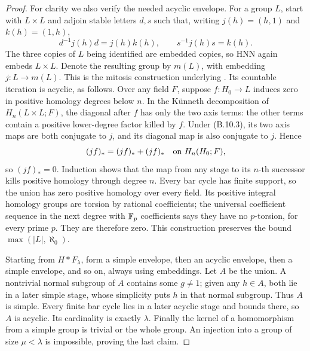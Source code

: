 \begin{proof}
For clarity we also verify the needed acyclic envelope. For
a group $L$, start with $L\times L$ and adjoin stable letters
$d,s$ such that, writing $j(h)=(h,1)$ and $k(h)=(1,h)$,
\[
 d^{-1}j(h)d=j(h)k(h),\qquad s^{-1}j(h)s=k(h).
 \tag{B.10.3}
\]
The three copies of $L$ being identified are embedded copies,
so HNN again embeds $L\times L$. Denote the resulting group
by $m(L)$, with embedding $j:L\to m(L)$. This is the
mitosis construction underlying
\citet[Proposition~4.1 and Theorem~4.2]{BaumslagDyerHeller1980}.
Its countable iteration is acyclic, as follows. Over any field
$F$, suppose $f:H_0\to L$ induces zero in positive homology
degrees below $n$. In the K\"unneth decomposition of
$H_n(L\times L;F)$, the diagonal after $f$ has only the two
axis terms: the other terms contain a positive lower-degree
factor killed by $f$. Under (B.10.3), its two axis maps are
both conjugate to $j$, and its diagonal map is also conjugate
to $j$. Hence
\[
 (jf)_*=(jf)_*+(jf)_*\quad\hbox{on }H_n(H_0;F),
\]
so $(jf)_*=0$. Induction shows that the map from any stage
to its $n$-th successor kills positive homology through
degree $n$. Every bar cycle has finite support, so the union
has zero positive homology over every field. Its positive
integral homology groups are torsion by rational coefficients;
the universal coefficient sequence in the next degree with
$\mathbb F_p$ coefficients says they have no $p$-torsion, for every
prime $p$. They are therefore zero. This construction preserves
the bound $\max(|L|,\aleph_0)$.

Starting from $H*F_\lambda$, form a simple envelope, then an
acyclic envelope, then a simple envelope, and so on, always
using embeddings. Let $A$ be the union. A nontrivial normal
subgroup of $A$ contains some $g\ne1$; given any $h\in A$,
both lie in a later simple stage, whose simplicity puts $h$
in that normal subgroup. Thus $A$ is simple. Every finite
bar cycle lies in a later acyclic stage and bounds there,
so $A$ is acyclic. Its cardinality is exactly $\lambda$.
Finally the kernel of a homomorphism from a simple group
is trivial or the whole group. An injection into a group
of size $\mu<\lambda$ is impossible, proving the last claim.
\end{proof}


